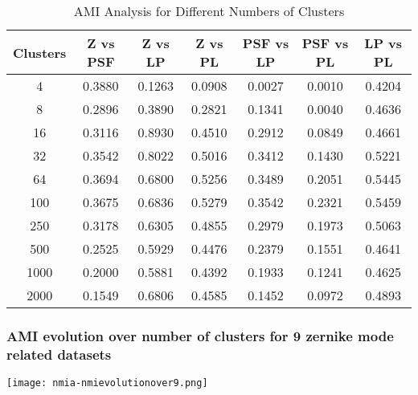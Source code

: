 		\begin{table}[h!]
\centering
\begin{tabular}{|c|c|c|c|c|c|c|}
\hline
\textbf{Clusters} & \textbf{Z vs PSF} & \textbf{Z vs LP} & \textbf{Z vs PL} & \textbf{PSF vs LP} & \textbf{PSF vs PL} & \textbf{LP vs PL} \\
\hline
4   & 0.3880 & 0.1263 & 0.0908 & 0.0027 & 0.0010 & 0.4204 \\ \hline
8   & 0.2896 & 0.3890 & 0.2821 & 0.1341 & 0.0040 & 0.4636 \\ \hline
16  & 0.3116 & 0.8930 & 0.4510 & 0.2912 & 0.0849 & 0.4661 \\ \hline
32  & 0.3542 & 0.8022 & 0.5016 & 0.3412 & 0.1430 & 0.5221 \\ \hline
64  & 0.3694 & 0.6800 & 0.5256 & 0.3489 & 0.2051 & 0.5445 \\ \hline
100 & 0.3675 & 0.6836 & 0.5279 & 0.3542 & 0.2321 & 0.5459 \\ \hline
250 & 0.3178 & 0.6305 & 0.4855 & 0.2979 & 0.1973 & 0.5063 \\ \hline
500 & 0.2525 & 0.5929 & 0.4476 & 0.2379 & 0.1551 & 0.4641 \\ \hline
1000 & 0.2000 & 0.5881 & 0.4392 & 0.1933 & 0.1241 & 0.4625 \\ \hline
2000 & 0.1549 & 0.6806 & 0.4585 & 0.1452 & 0.0972 & 0.4893 \\ \hline

\hline
\end{tabular}
\caption{AMI Analysis for Different Numbers of Clusters}
\end{table}
		\FloatBarrier
		
	\subsubsection{AMI evolution over number of clusters for 9 zernike mode related datasets}
		\begin{figure*}[ht!]
			\centering
			\texttt{[image: nmia-nmievolutionover9.png]}
		\end{figure*}

